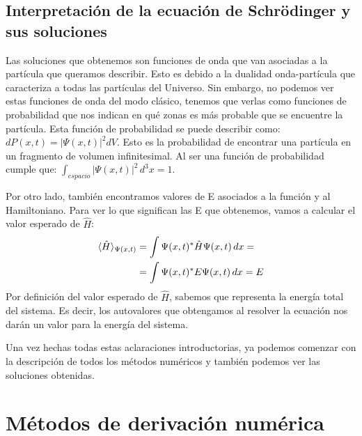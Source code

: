 \documentclass{article}
\begin{document}
	
		\subsection{Interpretación de la ecuación de Schrödinger y sus soluciones}
	Las soluciones que obtenemos son
	funciones de onda que van asociadas a la partícula que queramos 
	describir. Esto es debido a la dualidad onda-partícula que caracteriza
	a todas las partículas del Universo. Sin embargo, no podemos ver
	estas funciones de onda del modo clásico, tenemos que verlas como
	funciones de probabilidad que nos indican en qué zonas es más probable que se encuentre la partícula. Esta función de probabilidad
	se puede describir como: $dP(x,t)=\left\lvert \Psi (x,t) \right\rvert^{2} dV$.
	Esto es la probabilidad de encontrar una partícula en un fragmento
	de volumen infinitesimal. Al ser una función de probabilidad cumple que:
	$\int_{espacio} \left\lvert \Psi (x,t) \right\rvert^{2} \,d^{3}x=1$. \\
	\par
	Por otro lado, también encontramos valores de E asociados a la función y al Hamiltoniano. Para ver lo que significan las E que obtenemos, vamos a calcular el valor esperado de $\hat{H}$:
	\begin{align}
		\langle \hat{H} \rangle_{\Psi (x,t)} \notag 
		&=\int \Psi (x,t)^{*} \hat{H} \Psi (x,t) \,dx= \notag \\
		&=\int \Psi (x,t)^{*} E \Psi (x,t) \,dx= E
	\end{align}
	Por definición del valor esperado de $\hat{H}$, sabemos que representa
	la  energía total del sistema. Es decir, los autovalores que obtengamos
	al resolver la ecuación nos darán un valor para la energía
	del sistema. \\
	\par
	Una vez hechas todas estas aclaraciones introductorias, ya podemos
	comenzar con la descripción de todos los métodos numéricos y 
	también podemos ver las soluciones obtenidas.
	
	\newpage
	\section{Métodos de derivación numérica}
\end{document}
